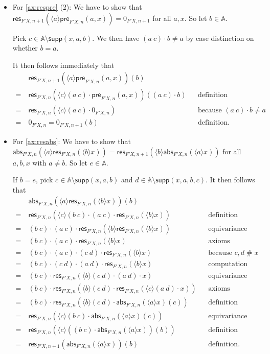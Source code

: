 \documentclass[a4paper,UKenglish,cleveref,thm-restate,numberwithinsect,final]{lipics-v2021}
\newcommand{\pre}{\mathsf{pre}}
\newcommand{\abs}{\mathsf{abs}}
\newcommand{\res}{\mathsf{res}}
\newcommand{\Names}{\mathbb{A}}
\newcommand{\fresh}{\mathbin{\#}}
\newcommand{\supp}{\mathsf{supp}}
\newcommand{\bind}[1]{\langle #1\rangle}
\theoremstyle{plain}
\numberwithin{equation}{section}
\newcommand{\+}[1]{\mathcal{#1}\xspace}
\theoremstyle{definition}
\begin{document}
\begin{itemize}
  \item For \eqref{ax:respre} (2):
    We have to show that \(\res_{F'X,n+1}(\bind{a} \pre_{F'X,n}(a,x)) = 0_{F'X,n+1}\) for all \(a,x\).
    So let \(b \in \Names\).

    Pick \(c \in \Names \setminus \supp(x, a, b)\).
    We then have \((a\ c) \cdot b \neq a\) by case distinction on whether \(b = a\).

    It then follows immediately that
    \begin{align*}
      &\res_{F'X,n+1}(\bind{a} \pre_{F'X,n}(a,x))(b) \\
      =~&\res_{F'X,n}(\bind{c} (a\ c) \cdot \pre_{F'X,n}(a,x))((a\ c) \cdot b) && \text{definition} \\
      =~&\res_{F'X,n}(\bind{c} (a\ c) \cdot 0_{F'X,n}) && \text{because } (a\ c) \cdot b \neq a \\
      =~&0_{F'X,n} = 0_{F'X,n+1}(b) && \text{definition}.
    \end{align*}
  \item For \eqref{ax:resabs}:
    We have to show that \(\abs_{F'X,n}(\bind{a} \res_{F'X, n}(\bind{b} x)) = \res_{F'X, n+1}(\bind{b} \abs_{F'X,n}(\bind{a} x))\) for all \(a,b,x\) with \(a \neq b\).
    So let \(e \in \Names\).

    If \(b = e\), pick \(c \in \Names \setminus \supp(x,a,b)\) and \(d \in \Names \setminus \supp(x,a,b,c)\).
    It then follows that
    \begin{align*}
      &\abs_{F'X,n}(\bind{a} \res_{F'X, n}(\bind{b} x))(b) \\
      =~&\res_{F'X, n}(\bind{c} (b\ c) \cdot (a\ c) \cdot \res_{F'X,n}(\bind{b} x)) && \text{definition} \\
      =~&(b\ c) \cdot (a\ c) \cdot \res_{F'X,n}(\bind{b} \res_{F'X,n}(\bind{b} x)) && \text{equivariance} \\
      =~&(b\ c) \cdot (a\ c) \cdot \res_{F'X,n}(\bind{b} x) && \text{axioms} \\
      =~&(b\ c) \cdot (a\ c) \cdot (c\ d) \cdot \res_{F'X,n}(\bind{b} x) && \text{because } c,d\fresh x \\
      =~&(b\ c) \cdot (c\ d) \cdot (a\ d) \cdot \res_{F'X,n}(\bind{b} x) && \text{computation} \\
      =~&(b\ c) \cdot \res_{F'X,n}(\bind{b} (c\ d) \cdot (a\ d) \cdot x) && \text{equivariance} \\
      =~&(b\ c) \cdot \res_{F'X,n}(\bind{b} (c\ d) \cdot \res_{F'X,n}(\bind{c} (a\ d) \cdot x)) && \text{axioms} \\
      =~&(b\ c) \cdot \res_{F'X,n}(\bind{b} (c\ d) \cdot \abs_{F'X,n}(\bind{a} x)(c)) && \text{definition} \\
      =~&\res_{F'X, n}(\bind{c} (b\ c) \cdot \abs_{F'X,n}(\bind{a} x)(c)) && \text{equivariance} \\
      =~&\res_{F'X, n}(\bind{c} ((b\ c) \cdot \abs_{F'X,n}(\bind{a} x))(b)) && \text{definition} \\
      =~&\res_{F'X,n+1}(\abs_{F'X,n}(\bind{a} x))(b) && \text{definition}.
    \end{align*}


\end{itemize}
\end{document}
